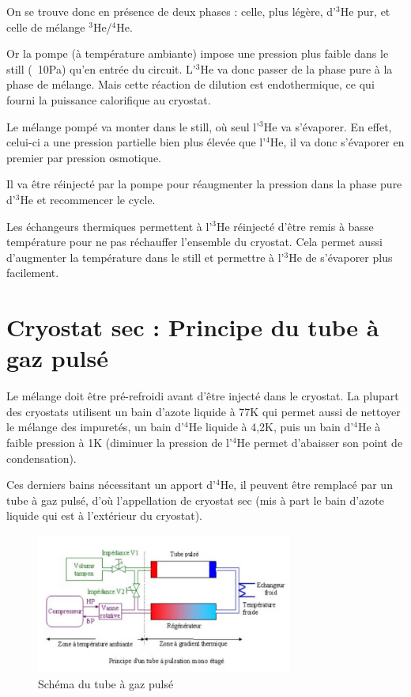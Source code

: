 \documentclass[a4paper,11pt]{report}
\newcommand{\HeT}{$^3$He\xspace}
\newcommand{\HeQ}{$^4$He\xspace}
\begin{document}
On se trouve donc en présence de deux phases : celle, plus légère, d'\HeT pur, et celle de mélange \HeT/\HeQ.
\newline

Or la pompe (à température ambiante) impose une pression plus faible dans le still (~10Pa) qu'en entrée du circuit. L'\HeT va donc passer de la phase pure à la phase de mélange. Mais cette réaction de dilution est endothermique, ce qui fourni la puissance calorifique au cryostat.

Le mélange pompé va monter dans le still, où seul l'\HeT va s'évaporer. En effet, celui-ci a une pression partielle bien plus élevée que l'\HeQ, il va donc s'évaporer en premier par pression osmotique.

Il va être réinjecté par la pompe pour réaugmenter la pression dans la phase pure d'\HeT et recommencer le cycle.
\newline

Les échangeurs thermiques permettent à l'\HeT réinjecté d'être remis à basse température pour ne pas réchauffer l'ensemble du cryostat. Cela permet aussi d'augmenter la température dans le still et permettre à l'\HeT de s'évaporer plus facilement.

\section{Cryostat sec : Principe du tube à gaz pulsé}
Le mélange doit être pré-refroidi avant d'être injecté dans le cryostat.\newline
La plupart des cryostats utilisent un bain d'azote liquide à 77K qui permet aussi de nettoyer le mélange des impuretés, un bain d'\HeQ liquide à 4,2K, puis un bain d'\HeQ à faible pression à 1K (diminuer la pression de l'\HeQ permet d'abaisser son point de condensation).

Ces derniers bains nécessitant un apport d'\HeQ, il peuvent être remplacé par un tube à gaz pulsé, d'où l'appellation de cryostat sec (mis à part le bain d'azote liquide qui est à l'extérieur du cryostat).

\begin{figure}[h]
    \begin{center}
        \includegraphics[width=0.75\textwidth]{Images/Cryostat_PulseTube_Schema.png}
        \caption{Schéma du tube à gaz pulsé}
    \end{center}
\end{figure}
\end{document}
